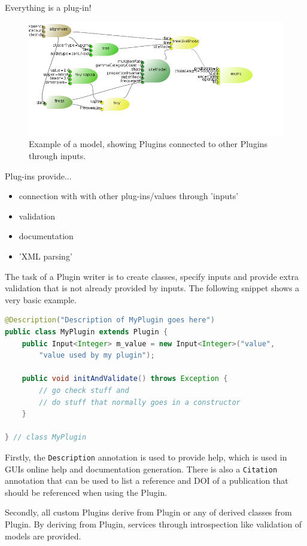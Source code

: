 \documentclass{article}
\begin{document}
Everything is a plug-in!

\begin{figure}
\includegraphics[width=\textwidth]{hkymodel.png}
\caption{\label{fig.hky}Example of a model, showing Plugins connected to
other Plugins through inputs.}
\end{figure}

Plug-ins provide...
\begin{itemize}
\item connection with with other plug-ins/values through 'inputs'
\item validation
\item documentation
\item 'XML parsing'
\end{itemize}

The task of a Plugin writer is to create classes, specify inputs and provide 
extra validation that is not already provided by inputs. The following snippet
shows a very basic example.

{\color{blue}\begin{lstlisting}[language=java]
@Description("Description of MyPlugin goes here")
public class MyPlugin extends Plugin {
    public Input<Integer> m_value = new Input<Integer>("value",
        "value used by my plugin");

    public void initAndValidate() throws Exception {
        // go check stuff and 
        // do stuff that normally goes in a constructor
    }

} // class MyPlugin
\end{lstlisting}}

Firstly, the {\tt Description} annotation is used to provide help, which is used in GUIs
online help and documentation generation. There is also a {\tt Citation} annotation
that can be used to list a reference and DOI of a publication that should be
referenced when using the Plugin.

Secondly, all custom Plugins derive from Plugin or any of derived classes from Plugin.
By deriving from Plugin,  services through introspection like validation of models are
provided.
\end{document}
